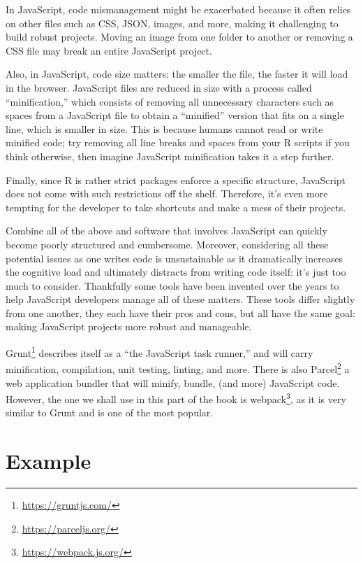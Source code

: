 \documentclass[
  10pt,
]{krantz}
\renewcommand{\href}[2]{#2\footnote{\url{#1}}}
\begin{document}
In JavaScript, code mismanagement might be exacerbated because it often relies on other files such as CSS, JSON, images, and more, making it challenging to build robust projects. Moving an image from one folder to another or removing a CSS file may break an entire JavaScript project.

Also, in JavaScript, code size matters: the smaller the file, the faster it will load in the browser. JavaScript files are reduced in size with a process called ``minification,'' which consists of removing all unnecessary characters such as spaces from a JavaScript file to obtain a ``minified'' version that fits on a single line, which is smaller in size. This is because humans cannot read or write minified code; try removing all line breaks and spaces from your R scripts if you think otherwise, then imagine JavaScript minification takes it a step further.

Finally, since R is rather strict packages enforce a specific structure, JavaScript does not come with such restrictions off the shelf. Therefore, it's even more tempting for the developer to take shortcuts and make a mess of their projects.

Combine all of the above and software that involves JavaScript can quickly become poorly structured and cumbersome. Moreover, considering all these potential issues as one writes code is unsustainable as it dramatically increases the cognitive load and ultimately distracts from writing code itself: it's just too much to consider. Thankfully some tools have been invented over the years to help JavaScript developers manage all of these matters. These tools differ slightly from one another, they each have their pros and cons, but all have the same goal: making JavaScript projects more robust and manageable.

\href{https://gruntjs.com/}{Grunt} describes itself as a ``the JavaScript task runner,'' and will carry minification, compilation, unit testing, linting, and more. There is also \href{https://parceljs.org/}{Parcel} a web application bundler that will minify, bundle, (and more) JavaScript code. However, the one we shall use in this part of the book is \href{https://webpack.js.org/}{webpack}, as it is very similar to Grunt and is one of the most popular.

\hypertarget{webpack-example}{%
\section{Example}\label{webpack-example}}
\end{document}
